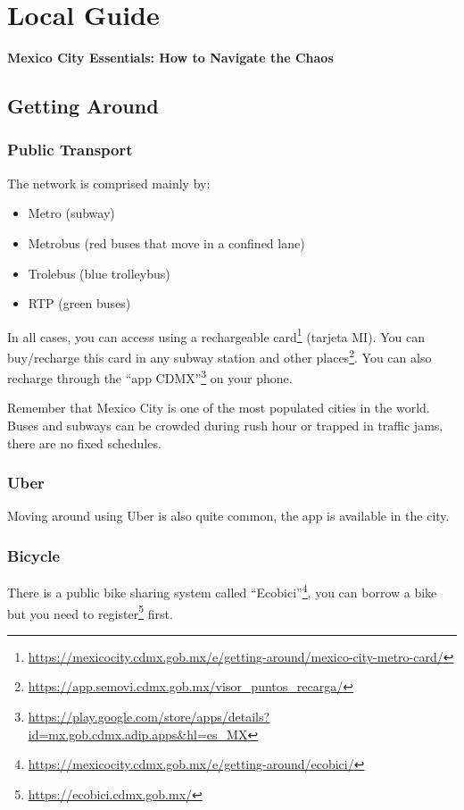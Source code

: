 \chapter{Local Guide}

{\bf\Large Mexico City Essentials: How to Navigate the Chaos}

\section*{Getting Around}

\subsection*{Public Transport}
The network is comprised mainly by:
\begin{itemize}
\setlength\parskip{0em}
\setlength\itemsep{0.3em}
\item Metro (subway)
\item Metrobus (red buses that move in a confined lane)
\item Trolebus (blue trolleybus)
\item RTP  (green buses)
\end{itemize}
In all cases, you can access using a rechargeable card\footnote{\url{https://mexicocity.cdmx.gob.mx/e/getting-around/mexico-city-metro-card/}} (tarjeta MI).
You can buy/recharge this card in any subway station and other places\footnote{\url{https://app.semovi.cdmx.gob.mx/visor_puntos_recarga/}}.
You  can also recharge through the ``app CDMX''\footnote{\url{https://play.google.com/store/apps/details?id=mx.gob.cdmx.adip.apps&hl=es_MX}} on your phone.

Remember that Mexico City is one of the most populated cities in the world. Buses and subways can be crowded during rush hour or trapped in traffic jams, there are no fixed schedules.

\subsection*{Uber}

Moving around using Uber is also quite common, the app is available in the city.

\subsection*{Bicycle}

There is a public bike sharing system called ``Ecobici''\footnote{\url{https://mexicocity.cdmx.gob.mx/e/getting-around/ecobici/}}, you can borrow a bike but you need to register\footnote{\url{https://ecobici.cdmx.gob.mx/}} first.

